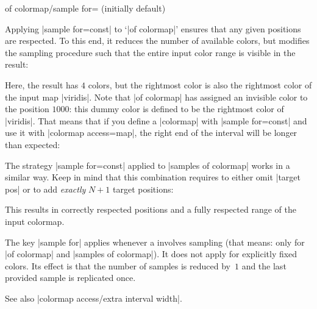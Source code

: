 {\begin{enumerate}
\begin{pgfplotskey}{of colormap/sample for= (initially default)}
\begin{itemize}
	Applying |sample for=const| to `|of colormap|' ensures that any given positions are respected. To this end, it reduces the number of available colors, but modifies the sampling procedure such that the entire input color range is visible in the result:
\begin{codeexample}[]
\pgfplotscolorbardrawstandalone[
	colormap={example}{%
		of colormap={
			viridis,
			target pos={0,500,850,950,1000},
			sample for=const,
		}
	},
	colorbar horizontal,
	colormap access=const]
\end{codeexample}
	Here, the result has $4$ colors, but the rightmost color is also the rightmost color of the input map |viridis|. Note that |of colormap| has assigned an invisible color to the position $1000$: this dummy color is defined to be the rightmost color of |viridis|. That means that if you define a |colormap| with |sample for=const| and use it with |colormap access=map|, the right end of the interval will be longer than expected:
\begin{codeexample}[]
\pgfplotscolorbardrawstandalone[
	colormap={example}{%
		of colormap={
			viridis,
			target pos={0,500,850,950,1000},
			sample for=const,
		}
	},
	colorbar horizontal,
	colormap access=map]
\end{codeexample}

	The strategy |sample for=const| applied to |samples of colormap| works in a similar way. Keep in mind that this combination requires to either omit |target pos| or to add \emph{exactly} $N+1$ target positions:
\begin{codeexample}[]
\pgfplotscolorbardrawstandalone[
	colormap={example}{%
		samples of colormap={
			5 of viridis,
			target pos={0,100,500,850,950,1000},
			sample for=const,
		}
	},
	colorbar horizontal,
	colormap access=const]
\end{codeexample}

		This results in correctly respected positions and a fully respected range of the input colormap.
	\end{itemize}

	The key |sample for| applies whenever a  involves sampling (that means: only for |of colormap| and |samples of colormap|). It does not apply for explicitly fixed colors. Its effect is that the number of samples is reduced by~$1$ and the last provided sample is replicated once.

	See also |colormap access/extra interval width|.
\end{pgfplotskey}


\end{enumerate}}
